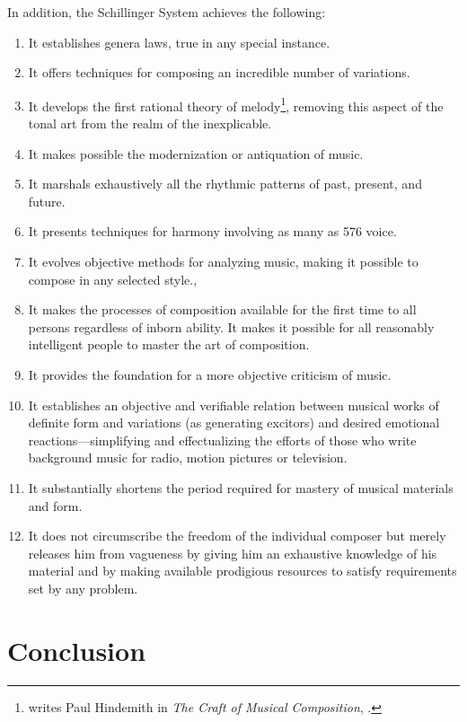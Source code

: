 In addition, the Schillinger System achieves the following:
 
 \begin{enumerate}
	 \item It establishes genera laws, true in any special instance.
	 \item It offers techniques for composing an incredible number of variations.
	 \item It develops the first rational theory of melody\footnote{ writes Paul Hindemith in \textit{The Craft of Musical Composition}, .}, removing this aspect of the tonal art from the realm of the inexplicable.
	 \item It makes possible the modernization or antiquation of music.
	 \item It marshals exhaustively all the rhythmic patterns of past, present, and future.
	 \item It presents techniques for harmony involving as many as 576 voice.
	 \item It evolves objective methods for analyzing music, making it possible to compose in any selected style.,
	 \item It makes the processes of composition available for the first time to all persons regardless of inborn ability. It makes it possible for all reasonably intelligent people to master the art of composition.
	 \item It provides the foundation for a more objective criticism of music.
	 \item It establishes an objective and verifiable relation between musical works of definite form and variations (as generating excitors) and desired emotional reactions---simplifying and effectualizing the efforts of those who write background music for radio, motion pictures or television.
	 \item It substantially shortens the period required for mastery of musical materials and form.
	 \item It does not circumscribe the freedom of the individual composer but merely releases him from vagueness by giving him an exhaustive knowledge of his material and by making available prodigious resources to satisfy requirements set by any problem.
\end{enumerate}

\section{Conclusion}


